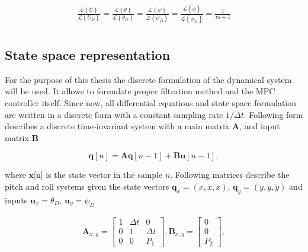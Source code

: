\begin{equation}
\begin{split}
\frac{\mathcal{L}\left\lbrace U \right\rbrace}{\mathcal{L}\left\lbrace U_D \right\rbrace} = \frac{\mathcal{L}\left\lbrace \theta \right\rbrace}{\mathcal{L}\left\lbrace \theta_D \right\rbrace} = \frac{\mathcal{L}\left\lbrace \psi \right\rbrace}{\mathcal{L}\left\lbrace \psi_D \right\rbrace} = \frac{\mathcal{L}\left\lbrace \dot{\phi} \right\rbrace}{\mathcal{L}\left\lbrace \dot{\phi}_D \right\rbrace} = \frac{1}{\tau s + 1}\\
\end{split}
\label{eq:first_order_stab}
\end{equation}

\subsection{State space representation}

For the purpose of this thesis the discrete formulation of the dynamical system will be used. It allows to formulate proper filtration method and the MPC controller itself. Since now, all differential equations and state space formulation are written in a discrete form with a constant sampling rate $1/\Delta t$. Following form describes a discrete time-invariant system with a main matrix $\mathbf{A}$, and input matrix $\mathbf{B}$

\begin{equation}
\mathbf{q}[n] = \mathbf{A}\mathbf{q}[n-1]+ \mathbf{B}\mathbf{u}[n-1],
\end{equation}

where $\mathbf{x}$[n] is the state vector in the sample $n$. Following matrices describe the pitch and roll systems given the state vectors $\mathbf{q}_{x} = \left(x, \dot{x}, \ddot{x}\right)$, $\mathbf{q}_{y} = \left(y, \dot{y}, \ddot{y}\right)$ and inputs $\mathbf{u}_x = \theta_D$, $\mathbf{u}_y = \psi_D$

\begin{equation}
\begin{split}
\mathbf{A}_{x, y} = \begin{bmatrix}
1 & \Delta t & 0 \\
0 & 1 & \Delta t \\
0 & 0 & P_1
\end{bmatrix}, \mathbf{B}_{x, y} = \begin{bmatrix}
0\\
0\\
P_2
\end{bmatrix},
\end{split}
\end{equation}

